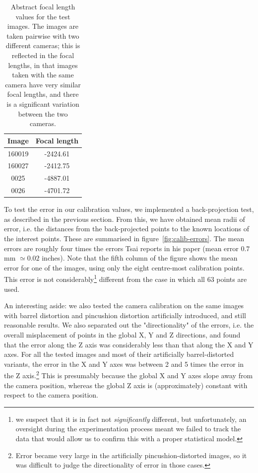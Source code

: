 \begin{table}[h]
  \centering
  \begin{tabular}{c c}
    \toprule
    \textbf{Image} & \textbf{Focal length}\\
    \midrule
    160019 & -2424.61\\
    160027 & -2412.75\\
    0025 & -4887.01\\
    0026 & -4701.72\\
    \bottomrule
  \end{tabular}
  \caption[Focal length values for the test images]{Abstract focal length
    values for the test images. The images are taken pairwise with two
    different cameras; this is reflected in the focal lengths,
    in that images taken with the same camera have very similar focal
    lengths, and there is a significant variation between the two cameras.}
  \label{tbl:focal-lengths}
\end{table}

To test the error in our calibration values, we 
implemented a back-projection test, as described in the previous
section. From this, we have obtained mean radii of error, i.e. the
distances from the back-projected points to the known locations of the
interest points. These are summarised in
figure~\ref{fig:calib-errors}. The mean errors are roughly four times
the errors Tsai reports in his paper (mean error $0.7$ mm $\simeq0.02$
inches). Note that the fifth column of the figure shows the mean error for one
of the images, using only the eight centre-most calibration points.
This error is not considerably\footnote{ we suspect that it is in fact not \emph{significantly} different, but unfortunately, an oversight during the experimentation process meant we failed to track the data that would allow us to confirm this with a proper statistical model.} different from the case in which all 63 points are used.

An interesting aside: we also tested the camera calibration on the same images with barrel distortion and pincushion distortion artificially introduced, and still reasonable results. We also separated out the "directionality" of the errors, i.e. the overall misplacement of points in the global X, Y and Z directions, and found that the error along the Z axis was considerably less than that along the X and Y axes. For all the tested images and most of their artificially barrel-distorted variants, the error in the X and Y axes was between 2 and 5 times the error in the Z axis.\footnote{ Error became very large in the artificially pincushion-distorted images, so it was difficult to judge the directionality of error in those cases.} This is presumably because the global X and Y axes slope away from the camera position, whereas the global Z axis is (approximately) constant with respect to the camera position.


